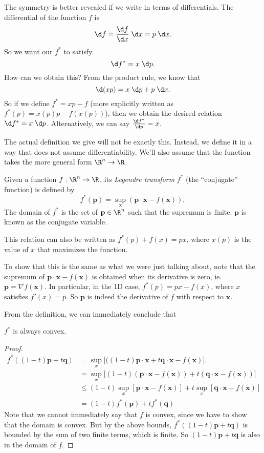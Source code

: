 \documentclass[a4paper]{article}
\begin{document}
The symmetry is better revealed if we write in terms of differentials. The differential of the function $f$ is
\[
  \d f = \frac{\d f}{\d x}\;\d x = p\;\d x.
\]
So we want our $f^*$ to satisfy
\[
  \d f^* = x\;\d p.
\]
How can we obtain this? From the product rule, we know that
\[
  \d (xp) = x\;\d p + p\;\d x.
\]
So if we define $f^* = xp - f$ (more explicitly written as $f^*(p) = x(p)p - f(x(p))$), then we obtain the desired relation $\d f^* = x\;\d p$. Alternatively, we can say $\frac{\d f^*}{\d p} = x$.

The actual definition we give will not be exactly this. Instead, we define it in a way that does not assume differentiability. We'll also assume that the function takes the more general form $\R^n \to \R$.
\begin{defi}
  Given a function $f: \R^n \to \R$, its \emph{Legendre transform} $f^*$ (the ``conjugate'' function) is defined by
  \[
    f^*(\mathbf{p}) = \sup_{\mathbf{x}}(\mathbf{p}\cdot \mathbf{x} - f(\mathbf{x})),
  \]
  The domain of $f^*$ is the set of $\mathbf{p}\in \R^n$ such that the supremum is finite. $\mathbf{p}$ is known as the conjugate variable.
\end{defi}
This relation can also be written as $f^*(p) + f(x) = px$, where $x(p)$ is the value of $x$ that maximizes the function.

To show that this is the same as what we were just talking about, note that the supremum of $\mathbf{p}\cdot \mathbf{x} - f(\mathbf{x})$ is obtained when its derivative is zero, ie. $\mathbf{p} = \nabla f(\mathbf{x})$. In particular, in the 1D case, $f^*(p) = px - f(x)$, where $x$ satisfies $f'(x) = p$. So $\mathbf{p}$ is indeed the derivative of $f$ with respect to $\mathbf{x}$.

From the definition, we can immediately conclude that
\begin{lemma}
  $f^*$ is always convex.
\end{lemma}

\begin{proof}
  \begin{align*}
    f^*((1 - t)\mathbf{p} + t\mathbf{q}) &= \sup_x \big[((1 - t)\mathbf{p}\cdot \mathbf{x} + t\mathbf{q}\cdot \mathbf{x} - f(\mathbf{x})\big].\\
    &= \sup_x \big[(1 - t)(\mathbf{p}\cdot \mathbf{x} - f(\mathbf{x})) + t(\mathbf{q}\cdot \mathbf{x} - f(\mathbf{x}))\big]\\
    &\leq (1 - t)\sup_x [\mathbf{p}\cdot \mathbf{x} - f(\mathbf{x})] + t\sup_x[\mathbf{q}\cdot \mathbf{x} - f(\mathbf{x})]\\
    &= (1 - t)f^*(\mathbf{p}) + tf^*(\mathbf{q})
  \end{align*}
  Note that we cannot immediately say that $f$ is convex, since we have to show that the domain is convex. But by the above bounds, $f^*((1 - t)\mathbf{p} + t\mathbf{q})$ is bounded by the sum of two finite terms, which is finite. So $(1 - t)\mathbf{p} + t\mathbf{q}$ is also in the domain of $f$.
\end{proof}
\end{document}

